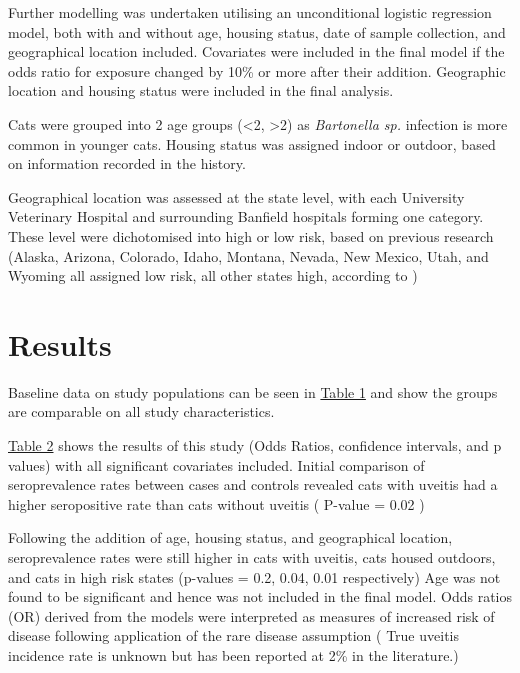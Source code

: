 \documentclass[11pt,twocolumn]{article}
\begin{document}
		Further modelling was undertaken utilising an unconditional logistic regression model, both with and without age, housing status, date of sample collection, and geographical location included. 
		Covariates were included in the final model if the odds ratio for exposure changed by 10\% or more after their addition.
		Geographic location and housing status were included in the final analysis.


		Cats were grouped into 2 age groups (\textless 2, \textgreater 2) as \emph{Bartonella sp.} infection is more common in younger cats.
		Housing status was assigned indoor or outdoor, based on information recorded in the history.


		Geographical location was assessed at the state level, with each University Veterinary Hospital and surrounding Banfield hospitals forming one category.
		These level were dichotomised into high or low risk, based on previous research (Alaska, Arizona, Colorado, Idaho, Montana, Nevada, New Mexico, Utah, and Wyoming all assigned low risk, all other states high, according to \cite{Jameson1995a})




\section{Results}


		Baseline data on study populations can be seen in \hyperref[tab:1]{Table 1} and show the groups are comparable on all study characteristics.


		\hyperref[tab:2]{Table 2} shows the results of this study (Odds Ratios, confidence intervals, and p values) with all significant covariates included.
		Initial comparison of seroprevalence rates between cases and controls revealed cats with uveitis had a higher seropositive rate than cats without uveitis ( P-value = 0.02 ) 


		Following the addition of age, housing status, and geographical location, seroprevalence rates were still higher in cats with uveitis, cats housed outdoors, and cats in high risk states (p-values = 0.2, 0.04, 0.01 respectively)
		Age was not found to be significant and hence was not included in the final model.
		Odds ratios (OR) derived from the models were interpreted as measures of increased risk of disease following application of the rare disease assumption ( True uveitis incidence rate is unknown but has been reported at 2\% in the literature.)
\end{document}
